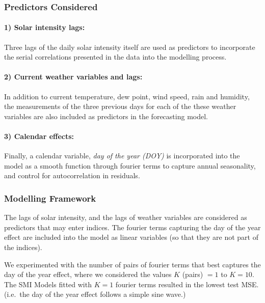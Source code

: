 \documentclass[
  11pt,
  a4paper,
]{article}
\begin{document}
\subsubsection{Predictors Considered}\label{predictors-considered-1}

\paragraph{1) Solar intensity lags:}\label{solar-intensity-lags}

Three lags of the daily solar intensity itself are used as predictors to
incorporate the serial correlations presented in the data into the
modelling process.

\paragraph{2) Current weather variables and
lags:}\label{current-weather-variables-and-lags}

In addition to current temperature, dew point, wind speed, rain and
humidity, the measurements of the three previous days for each of the
these weather variables are also included as predictors in the
forecasting model.

\paragraph{3) Calendar effects:}\label{calendar-effects-1}

Finally, a calendar variable, \emph{day of the year (DOY)} is
incorporated into the model as a smooth function through fourier terms
to capture annual seasonality, and control for autocorrelation in
residuals.

\subsubsection{Modelling Framework}\label{modelling-framework-1}

The lags of solar intensity, and the lags of weather variables are
considered as predictors that may enter indices. The fourier terms
capturing the day of the year effect are included into the model as
linear variables (so that they are not part of the indices).

We experimented with the number of pairs of fourier terms that best
captures the day of the year effect, where we considered the values
\(K\) (pairs) \(= 1\) to \(K = 10\). The SMI Models fitted with
\(K = 1\) fourier terms resulted in the lowest test MSE. (i.e.~the day
of the year effect follows a simple sine wave.)
\end{document}
